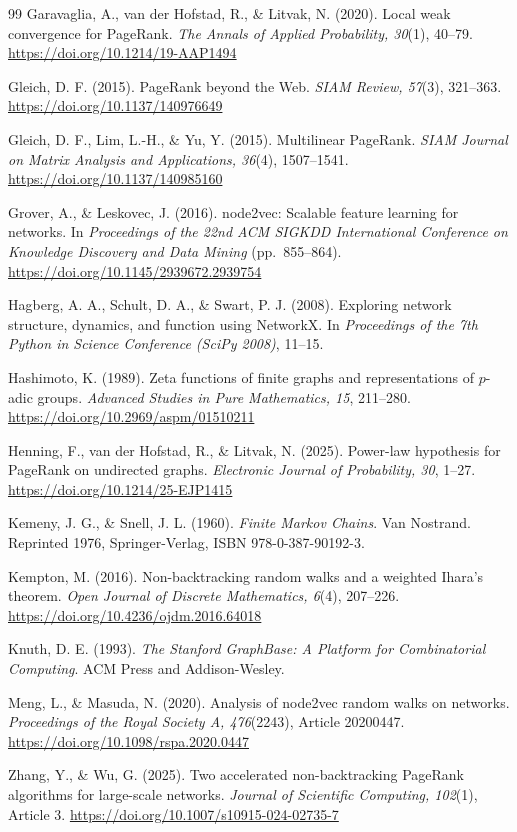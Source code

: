 \documentclass[11pt,a4paper]{article}
\theoremstyle{definition}\newtheorem{conjecture}{Conjecture}
\theoremstyle{remark}\newtheorem{remark}[theorem]{Remark}
\begin{document}
\begin{thebibliography}{99}
Garavaglia, A., van der Hofstad, R., \& Litvak, N. (2020).
Local weak convergence for PageRank.
\emph{The Annals of Applied Probability, 30}(1), 40--79.
\url{https://doi.org/10.1214/19-AAP1494}

Gleich, D. F. (2015).
PageRank beyond the Web.
\emph{SIAM Review, 57}(3), 321--363.
\url{https://doi.org/10.1137/140976649}

Gleich, D. F., Lim, L.-H., \& Yu, Y. (2015).
Multilinear PageRank.
\emph{SIAM Journal on Matrix Analysis and Applications, 36}(4), 1507--1541.
\url{https://doi.org/10.1137/140985160}

Grover, A., \& Leskovec, J. (2016).
node2vec: Scalable feature learning for networks.
In \emph{Proceedings of the 22nd ACM SIGKDD International Conference on Knowledge Discovery and Data Mining} (pp.~855--864).
\url{https://doi.org/10.1145/2939672.2939754}

Hagberg, A. A., Schult, D. A., \& Swart, P. J. (2008).
Exploring network structure, dynamics, and function using NetworkX.
In \emph{Proceedings of the 7th Python in Science Conference (SciPy 2008)}, 11--15.

Hashimoto, K. (1989).
Zeta functions of finite graphs and representations of $p$-adic groups.
\emph{Advanced Studies in Pure Mathematics, 15}, 211--280.
\url{https://doi.org/10.2969/aspm/01510211}

Henning, F., van der Hofstad, R., \& Litvak, N. (2025).
Power-law hypothesis for PageRank on undirected graphs.
\emph{Electronic Journal of Probability, 30}, 1--27.
\url{https://doi.org/10.1214/25-EJP1415}

Kemeny, J. G., \& Snell, J. L. (1960).
\emph{Finite Markov Chains}. Van Nostrand. Reprinted 1976, Springer-Verlag, ISBN 978-0-387-90192-3.

Kempton, M. (2016).
Non-backtracking random walks and a weighted Ihara's theorem.
\emph{Open Journal of Discrete Mathematics, 6}(4), 207--226.
\url{https://doi.org/10.4236/ojdm.2016.64018}

Knuth, D. E. (1993).
\emph{The Stanford GraphBase: A Platform for Combinatorial Computing}.
ACM Press and Addison-Wesley.

Meng, L., \& Masuda, N. (2020).
Analysis of node2vec random walks on networks.
\emph{Proceedings of the Royal Society A, 476}(2243), Article 20200447.
\url{https://doi.org/10.1098/rspa.2020.0447}

Zhang, Y., \& Wu, G. (2025).
Two accelerated non-backtracking PageRank algorithms for large-scale networks.
\emph{Journal of Scientific Computing, 102}(1), Article 3.
\url{https://doi.org/10.1007/s10915-024-02735-7}
\end{thebibliography}
\end{document}
